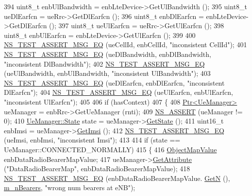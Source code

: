 \begin{DoxyCode}
394   uint8\_t enbUlBandwidth = enbLteDevice->GetUlBandwidth ();
395   uint8\_t ueDlEarfcn = ueRrc->GetDlEarfcn ();
396   uint8\_t enbDlEarfcn = enbLteDevice->GetDlEarfcn ();
397   uint8\_t ueUlEarfcn = ueRrc->GetUlEarfcn ();
398   uint8\_t enbUlEarfcn = enbLteDevice->GetUlEarfcn ();
399 
400   \hyperlink{group__testing_ga2a9d78cffb3db8e867c35fff0b698cf5}{NS\_TEST\_ASSERT\_MSG\_EQ} (ueCellId, enbCellId, \textcolor{stringliteral}{"inconsistent CellId"});
401   \hyperlink{group__testing_ga2a9d78cffb3db8e867c35fff0b698cf5}{NS\_TEST\_ASSERT\_MSG\_EQ} (ueDlBandwidth, enbDlBandwidth, \textcolor{stringliteral}{"inconsistent DlBandwidth"});
402   \hyperlink{group__testing_ga2a9d78cffb3db8e867c35fff0b698cf5}{NS\_TEST\_ASSERT\_MSG\_EQ} (ueUlBandwidth, enbUlBandwidth, \textcolor{stringliteral}{"inconsistent UlBandwidth"});
403   \hyperlink{group__testing_ga2a9d78cffb3db8e867c35fff0b698cf5}{NS\_TEST\_ASSERT\_MSG\_EQ} (ueDlEarfcn, enbDlEarfcn, \textcolor{stringliteral}{"inconsistent DlEarfcn"});
404   \hyperlink{group__testing_ga2a9d78cffb3db8e867c35fff0b698cf5}{NS\_TEST\_ASSERT\_MSG\_EQ} (ueUlEarfcn, enbUlEarfcn, \textcolor{stringliteral}{"inconsistent UlEarfcn"});
405 
406   \textcolor{keywordflow}{if} (hasContext)
407     \{
408       \hyperlink{classns3_1_1Ptr}{Ptr<UeManager>} ueManager = enbRrc->GetUeManager (rnti);
409       \hyperlink{assert_8h_a6dccdb0de9b252f60088ce281c49d052}{NS\_ASSERT} (ueManager != 0);
410       \hyperlink{classns3_1_1UeManager_a2f4085fdd18d7125c27da44a5b8b6808}{UeManager::State} state = ueManager->\hyperlink{classns3_1_1UeManager_a401868bb61523c594c69024e2231467a}{GetState} ();
411       uint16\_t enbImsi = ueManager->\hyperlink{classns3_1_1UeManager_a9609913bb407b13da17a55d9013e8e10}{GetImsi} ();
412       \hyperlink{group__testing_ga2a9d78cffb3db8e867c35fff0b698cf5}{NS\_TEST\_ASSERT\_MSG\_EQ} (ueImsi, enbImsi, \textcolor{stringliteral}{"inconsistent Imsi"});
413 
414       \textcolor{keywordflow}{if} (state == UeManager::CONNECTED\_NORMALLY)
415         \{
416           \hyperlink{classns3_1_1ObjectPtrContainerValue}{ObjectMapValue} enbDataRadioBearerMapValue;
417           ueManager->\hyperlink{classns3_1_1ObjectBase_a895d1de2f96063d0e0fd78463e7a7e30}{GetAttribute} (\textcolor{stringliteral}{"DataRadioBearerMap"}, enbDataRadioBearerMapValue);
418           \hyperlink{group__testing_ga2a9d78cffb3db8e867c35fff0b698cf5}{NS\_TEST\_ASSERT\_MSG\_EQ} (enbDataRadioBearerMapValue.
      \hyperlink{classns3_1_1ObjectPtrContainerValue_a0b282241030189e3f60e76e52d176710}{GetN} (), \hyperlink{classLteRrcConnectionEstablishmentTestCase_aed8d1feb0c1b557cd6685b17f3fa39f9}{m\_nBearers}, \textcolor{stringliteral}{"wrong num bearers at eNB"});

\end{DoxyCode}
